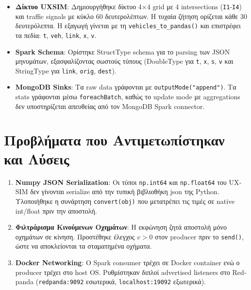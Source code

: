 \documentclass[11pt,a4paper]{article}
\begin{document}
\begin{itemize}
    \item \textbf{Δίκτυο \textlatin{UXSIM}}: Δημιουργήθηκε δίκτυο 4×4 \textlatin{grid} με 4 \textlatin{intersections} (\texttt{\textlatin{I1}}-\texttt{\textlatin{I4}}) και \textlatin{traffic signals} με κύκλο 60 δευτερολέπτων. Η τυχαία ζήτηση ορίζεται κάθε 30 δευτερόλεπτα. Η εξαγωγή γίνεται με τη \texttt{\textlatin{vehicles\_to\_pandas()}} και επιστρέφει τα πεδία: \texttt{\textlatin{t}}, \texttt{\textlatin{veh}}, \texttt{\textlatin{link}}, \texttt{\textlatin{x}}, \texttt{\textlatin{v}}.

    \item \textbf{\textlatin{Spark Schema}}: Ορίστηκε \textlatin{StructType} \textlatin{schema} για το \textlatin{parsing} των \textlatin{JSON} μηνυμάτων, \mbox{εξασφαλίζοντας} σωστούς τύπους (\textlatin{DoubleType} για \texttt{\textlatin{t}}, \texttt{\textlatin{x}}, \texttt{\textlatin{s}}, \texttt{\textlatin{v}} και \textlatin{StringType} για \texttt{\textlatin{link}}, \texttt{\textlatin{orig}}, \texttt{\textlatin{dest}}).

    \item \textbf{\textlatin{MongoDB Sinks}}: Τα \textlatin{raw data} γράφονται με \texttt{\textlatin{outputMode("append")}}. Τα \textlatin{stats} γράφονται μέσω \texttt{\textlatin{foreachBatch}}, καθώς το \textlatin{update mode} με \textlatin{aggregations} δεν υποστηρίζεται απευθείας από τον \textlatin{MongoDB Spark connector}.
\end{itemize}

\section{Προβλήματα που Αντιμετωπίστηκαν και Λύσεις}

\begin{enumerate}
    \item \textbf{\textlatin{Numpy JSON Serialization}}: Οι τύποι \textlatin{\texttt{np.int64}} και \textlatin{\texttt{np.float64}} του \textlatin{UXSIM} δεν γίνονται \textlatin{serialize} από την τυπική βιβλιοθήκη \textlatin{json} της \textlatin{Python}. Υλοποιήθηκε η συνάρτηση \textlatin{\texttt{convert(obj)}} που μετατρέπει τις τιμές σε \textlatin{native int/float} πριν την αποστολή.

    \item \textbf{Φιλτράρισμα Κινούμενων Οχημάτων}: Η εκφώνηση ζητά αποστολή μόνο οχημάτων σε κίνηση. Προστέθηκε έλεγχος $v > 0$ στον \textlatin{producer} πριν το \texttt{\textlatin{send()}}, ώστε να αποκλείονται τα σταματημένα οχήματα.

    \item \textbf{\textlatin{Docker Networking}}: Ο \textlatin{Spark consumer} τρέχει σε \textlatin{Docker container} ενώ ο \textlatin{producer} τρέχει στο \textlatin{host OS}. Ρυθμίστηκαν διπλοί \textlatin{advertised listeners} στο \textlatin{Redpanda} (\texttt{\textlatin{redpanda:9092}} εσωτερικά, \texttt{\textlatin{localhost:19092}} εξωτερικά).
\end{enumerate}
\end{document}
